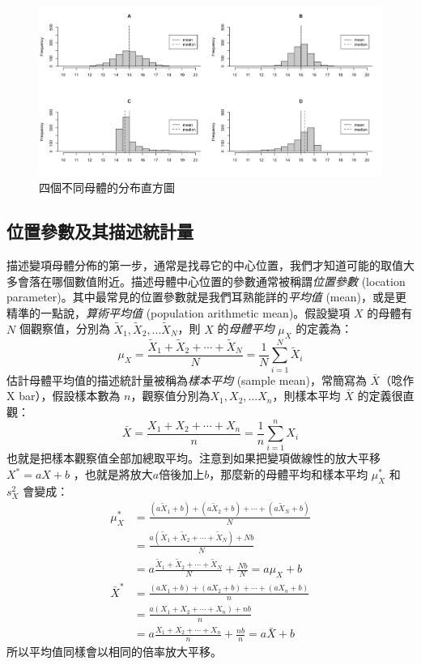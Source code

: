     \begin{figure}[htbp]
      \centering
      \includegraphics[width=\textwidth]{figures/02-Descriptive_statistics/descriptive_cont.png}
      \caption{四個不同母體的分布直方圖}
      \label{fig:descriptive_cont}
    \end{figure}

\subsection{位置參數及其描述統計量}
    描述變項母體分佈的第一步，通常是找尋它的中心位置，我們才知道可能的取值大多會落在哪個數值附近。描述母體中心位置的參數通常被稱謂\textit{位置參數} (location parameter)。其中最常見的位置參數就是我們耳熟能詳的\textit{平均值} (mean)，或是更精準的一點說，\textit{算術平均值} (population arithmetic mean)。假設變項 $X$ 的母體有 $N$ 個觀察值，分別為 $\tilde{X}_1, \tilde{X}_2, ... \tilde{X}_N$，則 $X$ 的\textit{母體平均} $\mu_X$ 的定義為：
    \[\mu_X = \frac{\tilde{X}_1+\tilde{X}_2+\cdots+\tilde{X}_N}{N} = \frac{1}{N}\sum_{i=1}^N \tilde{X}_i\]
    估計母體平均值的描述統計量被稱為\textit{樣本平均} (sample mean)，常簡寫為 $\bar{X}$（唸作 X bar），假設樣本數為 $n$，觀察值分別為$X_1, X_2, ... X_n$，則樣本平均 $\bar{X}$ 的定義很直觀：
    \[\bar{X} = \frac{X_1+X_2+\cdots+X_n}{n} = \frac{1}{n}\sum_{i=1}^n X_i\]
    也就是把樣本觀察值全部加總取平均。注意到如果把變項做線性的放大平移 $X^* = aX+b$ ，也就是將放大$a$倍後加上$b$，那麼新的母體平均和樣本平均 $\mu_X^*$ 和 $s_X^2$ 會變成：
    \begin{align*}
        \mu_X^* &= \frac{(a\tilde{X}_1+b)+(a\tilde{X}_2+b)+\cdots+(a\tilde{X}_N+b)}{N}\\
        &= \frac{a(\tilde{X}_1+\tilde{X}_2+\cdots+\tilde{X}_N)+Nb}{N}\\
        &= a\frac{\tilde{X}_1+\tilde{X}_2+\cdots+\tilde{X}_N}{N} + \frac{Nb}{N} = a\mu_X + b\\
        \bar{X}^* &= \frac{(aX_1+b)+(aX_2+b)+\cdots+(aX_n+b)}{n}\\
        &= \frac{a(X_1+X_2+\cdots+X_n)+nb}{n}\\
        &= a\frac{X_1+X_2+\cdots+X_n}{n}+\frac{nb}{n}=a\bar{X}+b
    \end{align*}
    所以平均值同樣會以相同的倍率放大平移。
    
